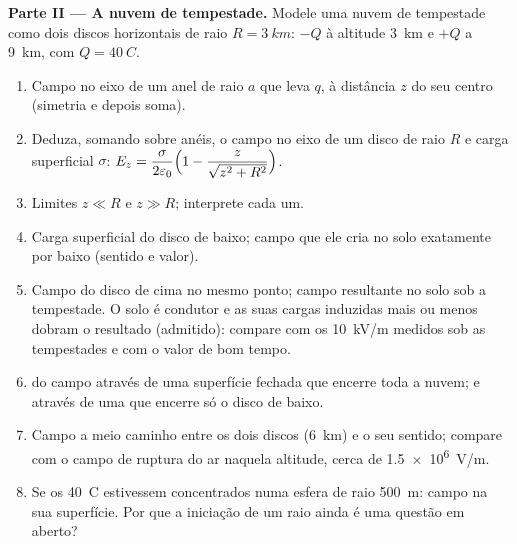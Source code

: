 \begin{problem}
\medskip
\noindent\textbf{Parte II --- A nuvem de tempestade.}
Modele uma nuvem de tempestade como dois discos horizontais de raio $R = \qty{3}{km}$:
$-Q$ à altitude \qty{3}{km} e $+Q$ a \qty{9}{km}, com $Q = \qty{40}{C}$.
\begin{enumerate}[resume]
  \item Campo no eixo de um anel de raio $a$ que leva $q$, à
        distância $z$ do seu centro (simetria e depois soma).
  \item Deduza, somando sobre anéis, o campo no eixo de um disco
        de raio $R$ e carga superficial $\sigma$:
        $E_z = \dfrac{\sigma}{2\varepsilon_0}\Bigl(1 - \dfrac{z}{\sqrt{z^2 + R^2}}\Bigr)$.
  \item Limites $z \ll R$ e $z \gg R$; interprete cada um.
  \item Carga superficial do disco de baixo; campo que ele cria no solo
        exatamente por baixo (sentido e valor).
  \item Campo do disco de cima no mesmo ponto; campo resultante no
        solo sob a tempestade. O solo é condutor e as suas cargas
        induzidas mais ou menos dobram o resultado (admitido): compare com os
        \qty{10}{kV/m} medidos sob as tempestades e com o valor de bom tempo.
  \item {} do campo através de uma superfície fechada que encerre toda a
        nuvem; e através de uma que encerre só o disco de baixo.
  \item Campo a meio caminho entre os dois discos (\qty{6}{km}) e o seu
        sentido; compare com o campo de ruptura do ar naquela
        altitude, cerca de \qty{1.5e6}{V/m}.
  \item Se os \qty{40}{C} estivessem concentrados numa esfera de raio
        \qty{500}{m}: campo na sua superfície. Por que a iniciação de um raio
        ainda é uma questão em aberto?
\end{enumerate}


\end{problem}
